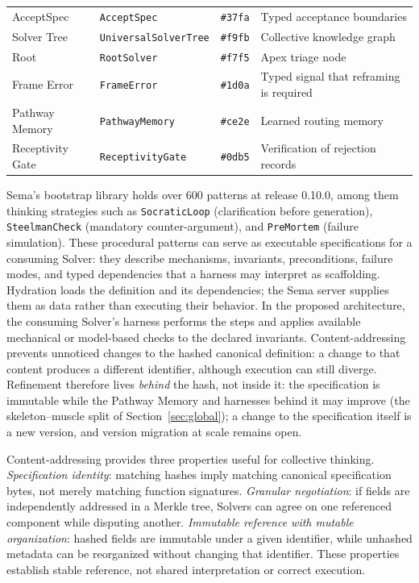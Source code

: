 \documentclass[11pt]{article}
\let\oldtexttt\texttt
\renewcommand{\texttt}[1]{\oldtexttt{\small #1}}
\begin{document}
\begin{table}[h]
\begin{tabular}{@{}llll@{}}
\quad AcceptSpec & \texttt{AcceptSpec} & \texttt{\#37fa} & Typed acceptance boundaries \\
\quad Solver Tree & \texttt{UniversalSolverTree} & \texttt{\#f9fb} & Collective knowledge graph \\
\quad Root & \texttt{RootSolver} & \texttt{\#f7f5} & Apex triage node \\
\quad Frame Error & \texttt{FrameError} & \texttt{\#1d0a} & Typed signal that reframing is required \\
\quad Pathway Memory & \texttt{PathwayMemory} & \texttt{\#ce2e} & Learned routing memory \\
\quad Receptivity Gate & \texttt{ReceptivityGate} & \texttt{\#0db5} & Verification of rejection records \\
\bottomrule
\end{tabular}
\end{table}

Sema's bootstrap library holds over 600 patterns at release 0.10.0, among them thinking strategies such as \texttt{SocraticLoop} (clarification before generation), \texttt{SteelmanCheck} (mandatory counter-argument), and \texttt{PreMortem} (failure simulation). These procedural patterns can serve as executable specifications for a consuming Solver: they describe mechanisms, invariants, preconditions, failure modes, and typed dependencies that a harness may interpret as scaffolding. Hydration loads the definition and its dependencies; the Sema server supplies them as data rather than executing their behavior. In the proposed architecture, the consuming Solver's harness performs the steps and applies available mechanical or model-based checks to the declared invariants. Content-addressing prevents unnoticed changes to the hashed canonical definition: a change to that content produces a different identifier, although execution can still diverge. Refinement therefore lives \emph{behind} the hash, not inside it: the specification is immutable while the Pathway Memory and harnesses behind it may improve (the skeleton--muscle split of Section~\ref{sec:global}); a change to the specification itself is a new version, and version migration at scale remains open.

Content-addressing provides three properties useful for collective thinking. \emph{Specification identity}: matching hashes imply matching canonical specification bytes, not merely matching function signatures. \emph{Granular negotiation}: if fields are independently addressed in a Merkle tree, Solvers can agree on one referenced component while disputing another. \emph{Immutable reference with mutable organization}: hashed fields are immutable under a given identifier, while unhashed metadata can be reorganized without changing that identifier. These properties establish stable reference, not shared interpretation or correct execution.
\end{document}
